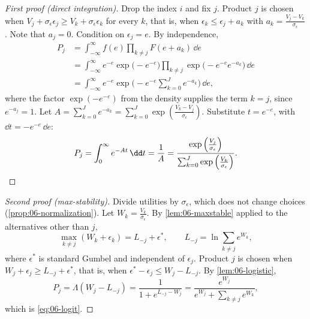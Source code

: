\begin{proof}[First proof (direct integration)]
Drop the index $i$ and fix $j$. Product $j$ is chosen when $V_j + \sigma_\epsilon\epsilon_j \ge V_k + \sigma_\epsilon\epsilon_k$
for every $k$, that is, when $\epsilon_k \le \epsilon_j + a_k$ with $a_k = \frac{V_j - V_k}{\sigma_\epsilon}$. Note that
$a_j = 0$. Condition on $\epsilon_j = e$. By independence,
\begin{align*}
P_j &= \int_{-\infty}^{\infty} f(e)\prod_{k\neq j}F(e + a_k)\,\dd e \\
&= \int_{-\infty}^{\infty} e^{-e}\exp\big(-e^{-e}\big)\prod_{k\neq j}\exp\big(-e^{-e}e^{-a_k}\big)\,\dd e \\
&= \int_{-\infty}^{\infty} e^{-e}\exp\Big(-e^{-e}\sum_{k=0}^J e^{-a_k}\Big)\,\dd e ,
\end{align*}
where the factor $\exp(-e^{-e})$ from the density supplies the term $k = j$, since $e^{-a_j} = 1$. Let
$A = \sum_{k=0}^J e^{-a_k} = \sum_{k=0}^J \exp\left(\frac{V_k - V_j}{\sigma_\epsilon}\right)$. Substitute $t = e^{-e}$,
with $\dd t = -e^{-e}\,\dd e$:
\begin{equation*}
P_j = \int_0^\infty e^{-At}\,\dd t = \frac{1}{A}
= \frac{\exp\left(\frac{V_j}{\sigma_\epsilon}\right)}{\sum_{k=0}^J \exp\left(\frac{V_k}{\sigma_\epsilon}\right)} . \qedhere
\end{equation*}
\end{proof}

\begin{proof}[Second proof (max-stability)]
Divide utilities by $\sigma_\epsilon$, which does not change choices (\cref{prop:06-normalization}). Let
$W_k = \frac{V_k}{\sigma_\epsilon}$. By \cref{lem:06-maxstable} applied to the alternatives other than $j$,
\begin{equation*}
\max_{k\neq j}(W_k + \epsilon_k) = L_{-j} + \epsilon^*, \qquad L_{-j} = \ln\sum_{k\neq j}e^{W_k},
\end{equation*}
where $\epsilon^*$ is standard Gumbel and independent of $\epsilon_j$. Product $j$ is chosen when
$W_j + \epsilon_j \ge L_{-j} + \epsilon^*$, that is, when $\epsilon^* - \epsilon_j \le W_j - L_{-j}$. By
\cref{lem:06-logistic},
\begin{equation*}
P_j = \Lambda(W_j - L_{-j}) = \frac{1}{1 + e^{L_{-j} - W_j}} = \frac{e^{W_j}}{e^{W_j} + \sum_{k\neq j}e^{W_k}} ,
\end{equation*}
which is \eqref{eq:06-logit}.
\end{proof}

